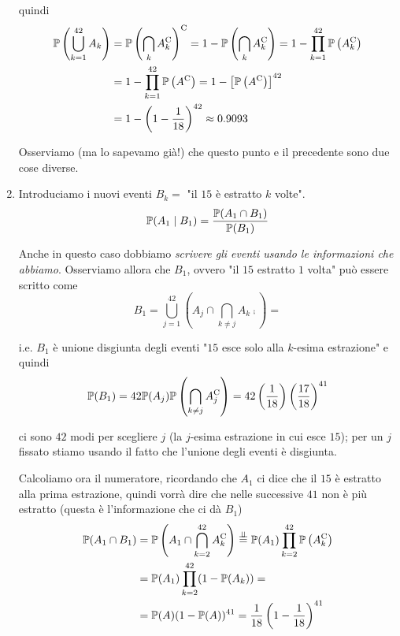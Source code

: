 \begin{enumerate}
quindi\begin{equation*}
\begin{aligned}
\mathbb{P}\left(\bigcup _{k=1}^{42} A_{k}\right) & =\mathbb{P}\left(\bigcap _{k} A_{k}^{\mathrm{C}}\right)^{\mathrm{C}} =1-\mathbb{P}\left(\bigcap _{k} A_{k}^{\mathrm{C}}\right) =1-\prod _{k=1}^{42}\mathbb{P}\left( A_{k}^{\mathrm{C}}\right)\\
 & =1-\prod _{k=1}^{42}\mathbb{P}\left( A^{\mathrm{C}}\right) =1-\left[\mathbb{P}\left( A^{\mathrm{C}}\right)\right]^{42}\\
 & =1-\left( 1-\frac{1}{18}\right)^{42} \approx 0.9093
\end{aligned}
\end{equation*}

\begin{oss}
Osserviamo (ma lo sapevamo già!) che questo punto e il precedente sono due cose diverse.
\end{oss}
\item Introduciamo i nuovi eventi $B_{k} =$ "il $15$ è estratto $k$ volte".\begin{equation*}
\mathbb{P}( A_{1} \mid B_{1}) =\frac{\mathbb{P}( A_{1} \cap B_{1})}{\mathbb{P}( B_{1})}
\end{equation*}

Anche in questo caso dobbiamo \textit{scrivere gli eventi usando le informazioni che abbiamo}. Osserviamo allora che $B_{1}$, ovvero "il $15$ estratto $1$ volta" può essere scritto come\begin{equation*}
B_{1} =\bigcup _{j=1}^{42}\left( A_{j} \cap \bigcap _{k\neq j} A_{k}\comp\right) =
\end{equation*}

i.e. $B_{1}$ è unione disgiunta degli eventi "$15$ esce solo alla $k$-esima estrazione" e quindi\begin{equation*}
\mathbb{P}( B_{1}) =42\mathbb{P}( A_{j})\mathbb{P}\left(\bigcap _{k\neq j} A_{j}^{\mathrm{C}}\right) =42\left(\frac{1}{18}\right)\left(\frac{17}{18}\right)^{41}
\end{equation*}

ci sono $42$ modi per scegliere $j$ (la $j$-esima estrazione in cui esce $15$); per un $j$ fissato stiamo usando il fatto che l'unione degli eventi è disgiunta.

Calcoliamo ora il numeratore, ricordando che $A_{1}$ ci dice che il $15$ è estratto alla prima estrazione, quindi vorrà dire che nelle successive $41$ non è più estratto (questa è l'informazione che ci dà $B_{1}$)\begin{equation*}
\begin{aligned}
\mathbb{P}( A_{1} \cap B_{1}) & =\mathbb{P}\left( A_{1} \cap \bigcap _{k=2}^{42} A_{k}^{\mathrm{C}}\right)\overset{\perp \!\!\! \perp }{=}\mathbb{P}( A_{1})\prod _{k=2}^{42}\mathbb{P}\left( A_{k}^{\mathrm{C}}\right)\\
 & =\mathbb{P}( A_{1})\prod _{k=2}^{42}( 1-\mathbb{P}( A_{k})) =\\
 & =\mathbb{P}( A)( 1-\mathbb{P}( A))^{41} =\frac{1}{18}\left( 1-\frac{1}{18}\right)^{41}
\end{aligned}
\end{equation*}


\end{enumerate}

